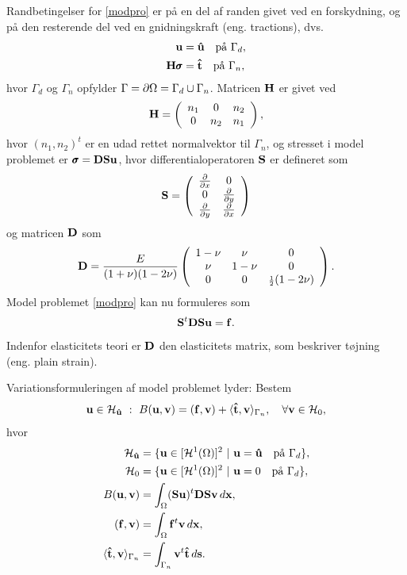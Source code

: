 Randbetingelser for \eqref{modpro} er på en del af randen givet ved en
forskydning, og på den resterende del ved en gnidningskraft (eng. tractions), dvs.
\begin{align}
  {\bf u} &= {\bf \hat{u}} \quad \text{på $\Gamma_d$}, \\
  {\bf H}{\pmb\sigma} &= {\bf \hat{t}} \quad \text{på $\Gamma_n$}, \label{bcstress}
\end{align}
hvor $\Gamma_d$ og $\Gamma_n$ opfylder $\Gamma =\partial\Omega =
\Gamma_d\cup\Gamma_n$. Matricen ${\bf H}$ er givet ved
\begin{equation}
{\bf H}=\left(
  \begin{array}{ccc}
    n_1 & 0 & n_2 \\
    0 & n_2 & n_1 
  \end{array}\right),
\end{equation}    
hvor $(n_1,n_2)^t$ er en udad rettet normalvektor til $\Gamma_n$, og
stresset i model problemet er $\pmb{\sigma}={\bf DSu}$, hvor
differentialoperatoren $\bf S$ er defineret som
\begin{equation}
{\bf S}=
\left(\begin{array}{cc}
  \frac{\partial}{\partial x} & 0 \\
  0 & \frac{\partial}{\partial y} \\
  \frac{\partial}{\partial y} & \frac{\partial}{\partial x}
\end{array}\right)
\end{equation}
og matricen $\bf D$ som
\begin{equation}
{\bf D}=
\frac{E}{(1+\nu)(1-2\nu)}
\left(\begin{array}{ccc}
  1-\nu & \nu & 0 \\
  \nu & 1-\nu & 0 \\
  0 & 0 & {\scriptstyle \frac{1}{2}} (1-2\nu) 
\end{array}\right).
\end{equation}
Model problemet \eqref{modpro} kan nu formuleres som
\begin{equation}
  {\bf S}^t{\bf DSu} = {\bf f}. 
\end{equation}
Indenfor elasticitets teori er $\bf D$ den elasticitets matrix, som
beskriver tøjning (eng. plain strain).

Variationsformuleringen af model problemet lyder: Bestem  
\begin{equation}
  {\bf u}\in\mathcal H_{\bf\hat{u}} \ : \
  B({\bf u},{\bf v}) = ({\bf f},{\bf v}) + 
  \langle{\bf \hat{t}}, {\bf v}\rangle_{\Gamma_n}, \quad \forall {\bf v}\in\mathcal H_0 ,
\end{equation}
hvor
\begin{align}
  \mathcal H_{\bf\hat{u}} &= 
    \{ {\bf u} \in [ \mathcal H^1(\Omega) ]^2 \ | \ {\bf u} =
    {\bf\hat{u}} \quad \text{på $\Gamma_d$} \}, \\
  \mathcal H_0 &= \{ {\bf u} \in [ \mathcal H^1(\Omega) ]^2 \ | \ {\bf u} =
    0 \quad \text{på $\Gamma_d$} \}, \\  
  B({\bf u},{\bf v}) &= 
    \int_\Omega ({\bf Su})^t{\bf DSv}\, d{\bf x}, \\
  ({\bf f},{\bf v}) &= \int_\Omega {\bf f}^t{\bf v}\, d{\bf x}, \\
  \langle{\bf \hat{t}}, {\bf v}\rangle_{\Gamma_n} &= \int_{\Gamma_n}  
    {\bf v}^t{\bf \hat{t}}\, d{\bf s}. 
\end{align}

